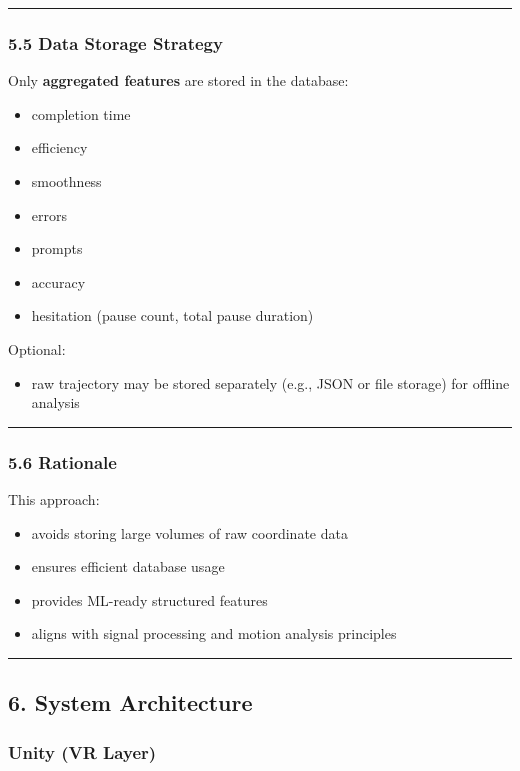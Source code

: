 \documentclass[11pt]{article}
\begin{document}
\hrule


\subsubsection*{5.5 Data Storage Strategy}


Only \textbf{aggregated features} are stored in the database:


\begin{itemize}
\item completion time
\item efficiency
\item smoothness
\item errors
\item prompts
\item accuracy
\item hesitation (pause count, total pause duration)
\end{itemize}

Optional:

\begin{itemize}
\item raw trajectory may be stored separately (e.g., JSON or file storage) for offline analysis
\end{itemize}

\hrule


\subsubsection*{5.6 Rationale}


This approach:


\begin{itemize}
\item avoids storing large volumes of raw coordinate data
\item ensures efficient database usage
\item provides ML-ready structured features
\item aligns with signal processing and motion analysis principles
\end{itemize}

\hrule


\subsection*{6. System Architecture}


\subsubsection*{Unity (VR Layer)}
\end{document}

